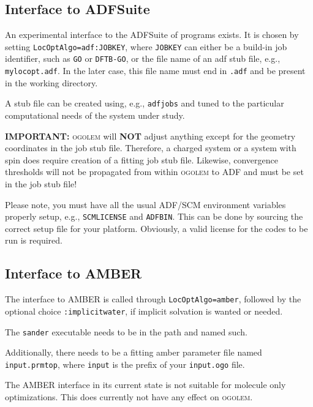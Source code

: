 \documentclass[a4paper,10pt]{scrbook}
\newcommand{\ogo}{\textsc{ogolem}}
\begin{document}

\subsection{Interface to ADFSuite}
An experimental interface to the ADFSuite of programs exists. It is chosen by
setting \texttt{LocOptAlgo=adf:JOBKEY}, where \texttt{JOBKEY} can either be a 
build-in job identifier, such as \texttt{GO} or \texttt{DFTB-GO}, or the file
name of an adf stub file, e.g., \texttt{mylocopt.adf}. In the later case, this 
file name
must end in \texttt{.adf} and be present in the working directory.

A stub file can be created using, e.g., \texttt{adfjobs} and tuned to the 
particular
computational needs of the system under study.

\textbf{IMPORTANT: } \ogo{} will \textbf{NOT} adjust anything except for the 
geometry coordinates
in the job stub file. Therefore, a charged system or a system with spin does 
require creation
of a fitting job stub file. Likewise, convergence thresholds will not be 
propagated
from within \ogo{} to ADF and must be set in the job stub file!

Please note, you must have all the usual ADF/SCM environment variables properly 
setup,
e.g., \texttt{SCMLICENSE} and \texttt{ADFBIN}. This can be done by sourcing the
correct setup file for your platform. Obviously, a valid license for the codes 
to be run
is required.

\subsection{Interface to AMBER}
The interface to AMBER is called through \texttt{LocOptAlgo=amber}, followed by
the optional choice \texttt{:implicitwater}, if implicit solvation is wanted or
needed.

The \texttt{sander} executable needs to be in the path and named such.

Additionally, there needs to be a fitting amber parameter file named
\texttt{input.prmtop}, where \texttt{input} is the prefix of your
\texttt{input.ogo} file.

The AMBER interface in its current state is not suitable for molecule only
optimizations. This does currently not have any effect on \ogo{}.
\end{document}
